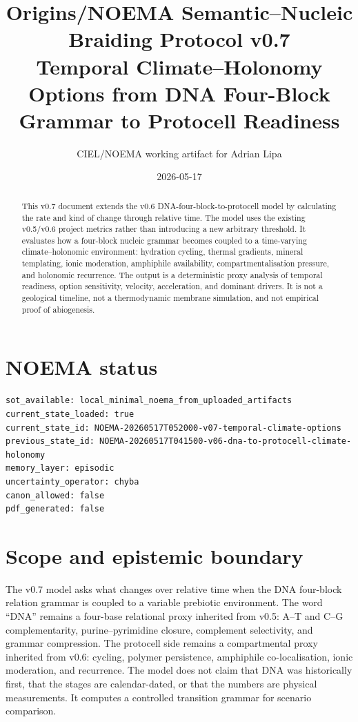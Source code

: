 \documentclass[11pt]{article}
\title{Origins/NOEMA Semantic--Nucleic Braiding Protocol v0.7\\
\large Temporal Climate--Holonomy Options from DNA Four-Block Grammar to Protocell Readiness}
\author{CIEL/NOEMA working artifact for Adrian Lipa}
\date{2026-05-17}
\begin{document}
\maketitle

\begin{abstract}
This v0.7 document extends the v0.6 DNA-four-block-to-protocell model by calculating the rate and kind of change through relative time.  The model uses the existing v0.5/v0.6 project metrics rather than introducing a new arbitrary threshold.  It evaluates how a four-block nucleic grammar becomes coupled to a time-varying climate--holonomic environment: hydration cycling, thermal gradients, mineral templating, ionic moderation, amphiphile availability, compartmentalisation pressure, and holonomic recurrence.  The output is a deterministic proxy analysis of temporal readiness, option sensitivity, velocity, acceleration, and dominant drivers. It is not a geological timeline, not a thermodynamic membrane simulation, and not empirical proof of abiogenesis.
\end{abstract}

\section*{NOEMA status}
\begin{verbatim}
sot_available: local_minimal_noema_from_uploaded_artifacts
current_state_loaded: true
current_state_id: NOEMA-20260517T052000-v07-temporal-climate-options
previous_state_id: NOEMA-20260517T041500-v06-dna-to-protocell-climate-holonomy
memory_layer: episodic
uncertainty_operator: chyba
canon_allowed: false
pdf_generated: false
\end{verbatim}

\section{Scope and epistemic boundary}
The v0.7 model asks what changes over relative time when the DNA four-block relation grammar is coupled to a variable prebiotic environment.  The word ``DNA'' remains a four-base relational proxy inherited from v0.5: A--T and C--G complementarity, purine--pyrimidine closure, complement selectivity, and grammar compression.  The protocell side remains a compartmental proxy inherited from v0.6: cycling, polymer persistence, amphiphile co-localisation, ionic moderation, and recurrence.  The model does not claim that DNA was historically first, that the stages are calendar-dated, or that the numbers are physical measurements.  It computes a controlled transition grammar for scenario comparison.
\end{document}
